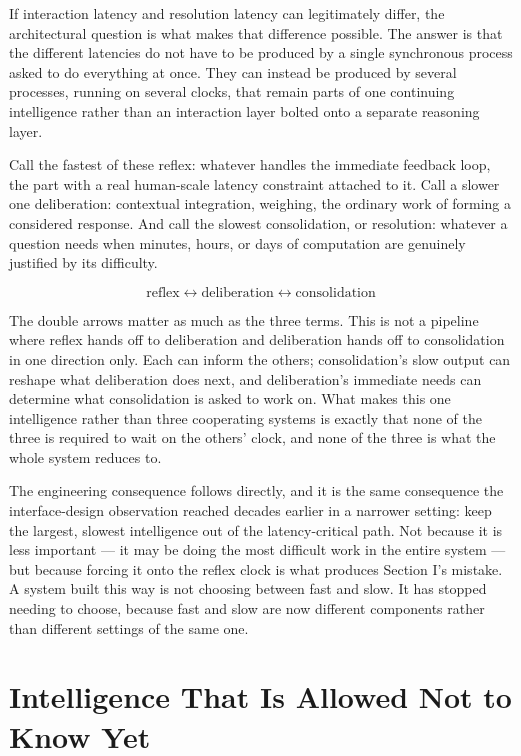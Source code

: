 \documentclass[11pt]{article}
\begin{document}
If interaction latency and resolution latency can legitimately differ, the architectural question is what makes that difference possible. The answer is that the different latencies do not have to be produced by a single synchronous process asked to do everything at once. They can instead be produced by several processes, running on several clocks, that remain parts of one continuing intelligence rather than an interaction layer bolted onto a separate reasoning layer.

Call the fastest of these reflex: whatever handles the immediate feedback loop, the part with a real human-scale latency constraint attached to it. Call a slower one deliberation: contextual integration, weighing, the ordinary work of forming a considered response. And call the slowest consolidation, or resolution: whatever a question needs when minutes, hours, or days of computation are genuinely justified by its difficulty.

\[
\text{reflex} \longleftrightarrow \text{deliberation} \longleftrightarrow \text{consolidation}
\]

The double arrows matter as much as the three terms. This is not a pipeline where reflex hands off to deliberation and deliberation hands off to consolidation in one direction only. Each can inform the others; consolidation's slow output can reshape what deliberation does next, and deliberation's immediate needs can determine what consolidation is asked to work on. What makes this one intelligence rather than three cooperating systems is exactly that none of the three is required to wait on the others' clock, and none of the three is what the whole system reduces to.

The engineering consequence follows directly, and it is the same consequence the interface-design observation reached decades earlier in a narrower setting: keep the largest, slowest intelligence out of the latency-critical path. Not because it is less important --- it may be doing the most difficult work in the entire system --- but because forcing it onto the reflex clock is what produces Section I's mistake. A system built this way is not choosing between fast and slow. It has stopped needing to choose, because fast and slow are now different components rather than different settings of the same one.

\section{Intelligence That Is Allowed Not to Know Yet}
\end{document}
